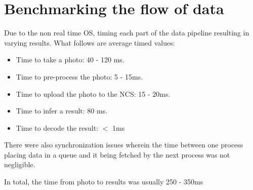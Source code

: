 \section{Benchmarking the flow of data}
Due to the non real time OS, timing each part of the data pipeline resulting in varying results. What follows are average timed values:

\begin{itemize}
\item Time to take a photo: 40 - 120 ms.
\item Time to pre-process the photo: 5 - 15ms.
\item Time to upload the photo to the NCS: 15 - 20ms.
\item Time to infer a result: 80 ms.
\item Time to decode the result: $<$ 1ms
\end{itemize}

There were also synchronization issues wherein the time between one process placing data in a queue and it being fetched by the next process was not negligible.

In total, the time from photo to results was usually 250 - 350ms
